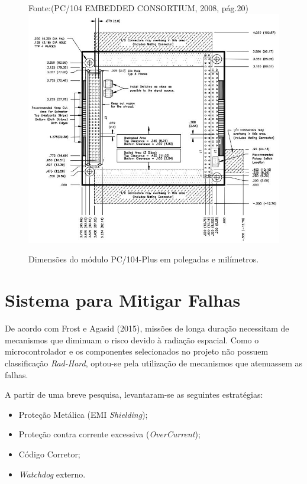 \begin{figure}[h]
\footnotesize{	
	\centering
	Fonte:(PC/104 EMBEDDED CONSORTIUM, 2008, pág.20)	
	\includegraphics[keepaspectratio=true,scale=0.64]{figuras/pc104_32bit.PNG}
	\caption{Dimensões do módulo PC/104-Plus em polegadas e milímetros.}
	\label{pc104}
}
\end{figure}
\FloatBarrier

\section{Sistema para Mitigar Falhas}

De acordo com  Frost e Agasid (2015), missões de longa duração necessitam de mecanismos que diminuam o risco devido à radiação espacial. Como o microcontrolador e os componentes selecionados no projeto não possuem classificação \textit{Rad-Hard}, optou-se pela utilização de mecanismos que atenuassem as falhas. 

A partir de uma breve pesquisa, levantaram-se as seguintes estratégias:
\begin{itemize}
	\item Proteção Metálica (EMI \textit{Shielding});
	\item Proteção contra corrente excessiva (\textit{OverCurrent});
	\item Código Corretor;
	\item \textit{Watchdog} externo.
\end{itemize}

